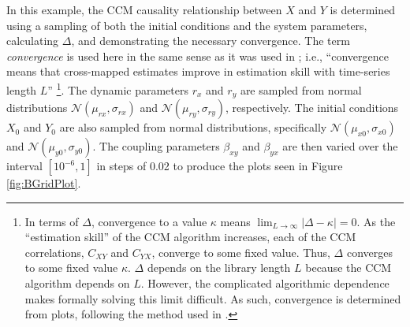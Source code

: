 \documentclass[twocolumn,aps,pre,groupedaddress]{revtex4-1}
\begin{document}
In this example, the CCM causality relationship between $X$ and $Y$ is determined using a sampling of both the initial conditions and the system parameters, calculating $\Delta$, and demonstrating the necessary convergence.  The term {\em convergence} is used here in the same sense as it was used in \cite{Sugihara2012}; i.e., ``convergence means that cross-mapped estimates improve in estimation skill with time-series length $L$'' \footnote{In terms of $\Delta$, convergence to a value $\kappa$ means $\lim_{L\rightarrow\infty}|\Delta-\kappa| = 0$.  As the ``estimation skill'' of the CCM algorithm increases, each of the CCM correlations, $C_{XY}$ and $C_{YX}$, converge to some fixed value.  Thus, $\Delta$ converges to some fixed value $\kappa$.  $\Delta$ depends on the library length $L$ because the CCM algorithm depends on $L$.  However, the complicated algorithmic dependence makes formally solving this limit difficult.  As such, convergence is determined from plots, following the method used in  \cite{Sugihara2012}.}.  The dynamic parameters $r_x$ and $r_y$ are sampled from normal distributions $\mathcal{N}\left(\mu_{rx},\sigma_{rx}\right)$ and $\mathcal{N}\left(\mu_{ry},\sigma_{ry}\right)$, respectively.  The initial conditions $X_0$ and $Y_0$ are also sampled from normal distributions, specifically $\mathcal{N}\left(\mu_{x0},\sigma_{x0}\right)$ and $\mathcal{N}\left(\mu_{y0},\sigma_{y0}\right)$.  The coupling parameters $\beta_{xy}$ and $\beta_{yx}$ are then varied over the interval $[10^{-6},1]$ in steps of 0.02 to produce the plots seen in Figure \ref{fig:BGridPlot}.
\end{document}
